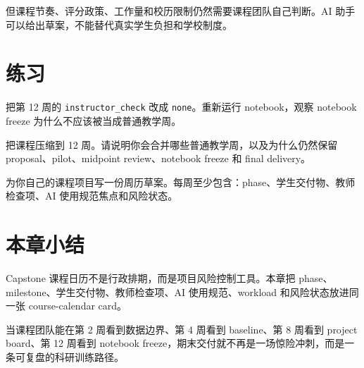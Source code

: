 但课程节奏、评分政策、工作量和校历限制仍然需要课程团队自己判断。AI 助手可以给出草案，不能替代真实学生负担和学校制度。

\section{练习}

\begin{exercisebox}[基础练习]
把第 12 周的 \texttt{instructor\_check} 改成 \texttt{none}。重新运行 notebook，观察 notebook freeze 为什么不应该被当成普通教学周。
\end{exercisebox}

\begin{exercisebox}[进阶练习]
把课程压缩到 12 周。请说明你会合并哪些普通教学周，以及为什么仍然保留 proposal、pilot、midpoint review、notebook freeze 和 final delivery。
\end{exercisebox}

\begin{exercisebox}[开放练习]
为你自己的课程项目写一份周历草案。每周至少包含：phase、学生交付物、教师检查项、AI 使用规范焦点和风险状态。
\end{exercisebox}

\section{本章小结}

Capstone 课程日历不是行政排期，而是项目风险控制工具。本章把 phase、milestone、学生交付物、教师检查项、AI 使用规范、workload 和风险状态放进同一张 course-calendar card。

当课程团队能在第 2 周看到数据边界、第 4 周看到 baseline、第 8 周看到 project board、第 12 周看到 notebook freeze，期末交付就不再是一场惊险冲刺，而是一条可复盘的科研训练路径。
